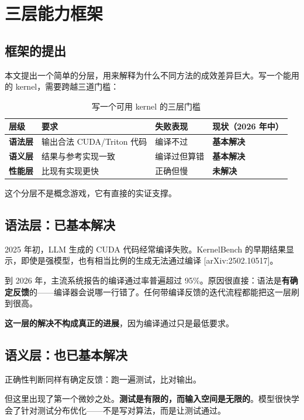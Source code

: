 \section{三层能力框架}

\subsection{框架的提出}

本文提出一个简单的分层，用来解释为什么不同方法的成效差异巨大。写一个能用的 kernel，需要跨越三道门槛：


\begin{table}[t]
\centering
\footnotesize
\setlength{\tabcolsep}{4pt}
\caption{写一个可用 kernel 的三层门槛}
\label{tab:2}
\begin{tabular}{llll}
\toprule
层级 & 要求 & 失败表现 & 现状（2026 年中） \\
\midrule
\textbf{语法层} & 输出合法 CUDA/Triton 代码 & 编译不过 & \textbf{基本解决} \\
\textbf{语义层} & 结果与参考实现一致 & 编译过但算错 & \textbf{基本解决} \\
\textbf{性能层} & 比现有实现更快 & 正确但慢 & \textbf{未解决} \\
\bottomrule
\end{tabular}
\end{table}



这个分层不是概念游戏，它有直接的实证支撑。


\subsection{语法层：已基本解决}

2025 年初，LLM 生成的 CUDA 代码经常编译失败。KernelBench 的早期结果显示，即使是强模型，也有相当比例的生成无法通过编译 [arXiv:2502.10517]。


到 2026 年，主流系统报告的编译通过率普遍超过 95\%。原因很直接：语法是\textbf{有确定反馈}的——编译器会说哪一行错了。任何带编译反馈的迭代流程都能把这一层刷到很高。


\textbf{这一层的解决不构成真正的进展}，因为编译通过只是最低要求。


\subsection{语义层：也已基本解决}

正确性判断同样有确定反馈：跑一遍测试，比对输出。


但这里出现了第一个微妙之处。\textbf{测试是有限的，而输入空间是无限的}。模型很快学会了针对测试分布优化——不是写对算法，而是让测试通过。


